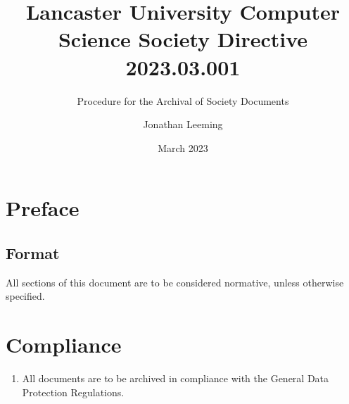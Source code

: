 \documentclass{scrartcl}
\title{Lancaster University Computer Science Society Directive 2023.03.001}
\subtitle{Procedure for the Archival of Society Documents}
\author{Jonathan Leeming}
\date{March 2023}
\begin{document}
    \maketitle
    
    \clearpage
    \tableofcontents

    \clearpage
    \section{Preface}
        \label{preface}
        \subsection{Format}
            \label{preface--format}
            All sections of this document are to be considered normative, unless otherwise specified.

    \section{Compliance}
        \label{compliance}
        \begin{enumerate}
            \item All documents are to be archived in compliance with the General Data Protection Regulations.
        \end{enumerate}
    \clearpage
\end{document}
